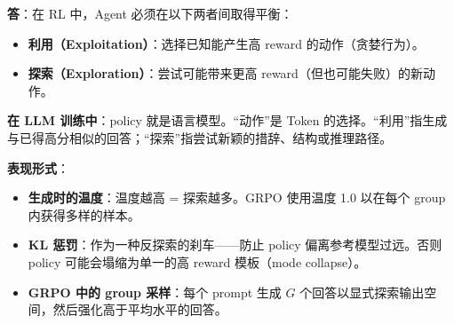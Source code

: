 \begin{questionbox}
\textbf{答}：在 RL 中，Agent 必须在以下两者间取得平衡：

\begin{itemize}
  \item \textbf{利用（Exploitation）}：选择已知能产生高 reward 的动作（贪婪行为）。
  \item \textbf{探索（Exploration）}：尝试可能带来更高 reward（但也可能失败）的新动作。
\end{itemize}

\textbf{在 LLM 训练中}：policy 就是语言模型。“动作”是 Token 的选择。“利用”指生成与已得高分相似的回答；“探索”指尝试新颖的措辞、结构或推理路径。

\textbf{表现形式}：

\begin{itemize}
  \item \textbf{生成时的温度}：温度越高 = 探索越多。GRPO 使用温度 1.0 以在每个 group 内获得多样的样本。
  \item \textbf{KL 惩罚}：作为一种反探索的刹车——防止 policy 偏离参考模型过远。否则 policy 可能会塌缩为单一的高 reward 模板（mode collapse）。
  \item \textbf{GRPO 中的 group 采样}：每个 prompt 生成 $G$ 个回答以显式探索输出空间，然后强化高于平均水平的回答。
\end{itemize}


\end{questionbox}
